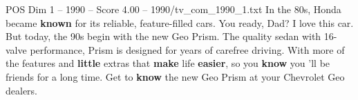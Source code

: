 \begin{textsample}{POS Dim 1 – 1990 – Score 4.00 – 1990/tv\_com\_1990\_1.txt}  \label{ex:f1_pos_057}
In the 80s, Honda became \textbf{known} for its reliable, feature-filled cars.
You ready, Dad?
I love this car.
But today, the 90s begin with the new Geo Prism.
The quality sedan with 16-valve performance, Prism is designed for years of carefree driving.
With more of the features and \textbf{little} extras that \textbf{make} life \textbf{easier}, so you \textbf{know} you 'll be friends for a long time.
Get to \textbf{know} the new Geo Prism at your Chevrolet Geo dealers.

\end{textsample}

